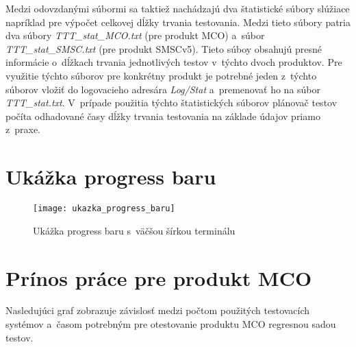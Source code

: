 Medzi odovzdanými súbormi sa taktiež nachádzajú dva štatistické súbory 
slúžiace napríklad pre výpočet celkovej dĺžky trvania testovania. 
Medzi tieto súbory patria dva súbory \textit{TTT\_stat\_MCO.txt} (pre produkt MCO) 
a~súbor \textit{TTT\_stat\_SMSC.txt} (pre produkt SMSCv5).
Tieto súboy obsahujú presné informácie o~dĺžkach trvania jednotlivých 
testov v~týchto dvoch produktov. 
Pre využitie týchto súborov pre konkrétny produkt je potrebné jeden 
z~týchto súborov vložiť do logovacieho adresára \textit{Log/Stat} 
a~premenovať ho na súbor \textit{TTT\_stat.txt}.
V~prípade použitia týchto štatistických súborov plánovač testov počíta
odhadované časy dĺžky trvania testovania na základe údajov priamo z~praxe.



%
%
\chapter{Ukážka progress baru}
\label{priloha:ukazka_progress_baru}
\begin{figure}[h]
  \begin{center}
    \texttt{[image: ukazka\_progress\_baru]} 
    \caption{Ukážka progress baru s~väčšou šírkou terminálu}
  \end{center}
\end{figure}



%
%
\chapter{Prínos práce pre produkt MCO}
\label{priloha:graf_mco}
Nasledujúci graf zobrazuje závislosť medzi počtom použitých testovacích
systémov a~časom potrebným pre otestovanie produktu MCO regresnou 
sadou testov.

\begin{figure}[h!]
\end{figure}



